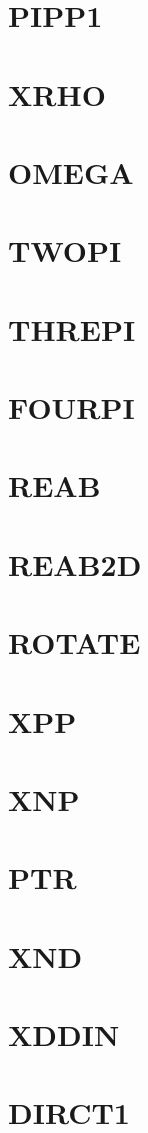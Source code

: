 \documentclass[14pt,UTF8]{ctexbook}
\begin{document}
\section{PIPP1}
\section{XRHO}
\section{OMEGA}
\section{TWOPI}
\section{THREPI}
\section{FOURPI}
\section{REAB}
\section{REAB2D}
\section{ROTATE}
\section{XPP}
\section{XNP}
\section{PTR}
\section{XND}
\section{XDDIN}
\section{DIRCT1}
\end{document}
